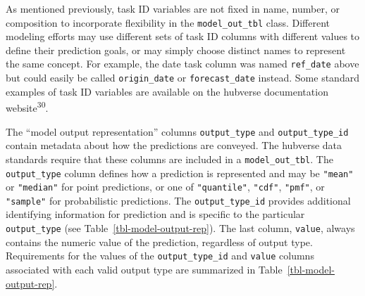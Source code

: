 \documentclass[
]{article}
\begin{document}
As mentioned previously, task ID variables are not fixed in name,
number, or composition to incorporate flexibility in the
\texttt{model\_out\_tbl} class. Different modeling efforts may use
different sets of task ID columns with different values to define their
prediction goals, or may simply choose distinct names to represent the
same concept. For example, the date task column was named
\texttt{ref\_date} above but could easily be called
\texttt{origin\_date} or \texttt{forecast\_date} instead. Some standard
examples of task ID variables are available on the hubverse
documentation website\textsuperscript{30}.

The ``model output representation'' columns \texttt{output\_type} and
\texttt{output\_type\_id} contain metadata about how the predictions are
conveyed. The hubverse data standards require that these columns are
included in a \texttt{model\_out\_tbl}. The \texttt{output\_type} column
defines how a prediction is represented and may be \texttt{"mean"} or
\texttt{"median"} for point predictions, or one of \texttt{"quantile"},
\texttt{"cdf"}, \texttt{"pmf"}, or \texttt{"sample"} for probabilistic
predictions. The \texttt{output\_type\_id} provides additional
identifying information for prediction and is specific to the particular
\texttt{output\_type} (see Table~\ref{tbl-model-output-rep}). The last
column, \texttt{value}, always contains the numeric value of the
prediction, regardless of output type. Requirements for the values of
the \texttt{output\_type\_id} and \texttt{value} columns associated with
each valid output type are summarized in
Table~\ref{tbl-model-output-rep}.
\end{document}
